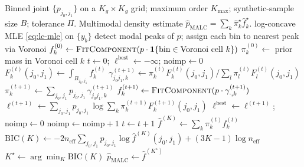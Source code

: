 \documentclass[11pt]{article}
\theoremstyle{plain}
\theoremstyle{definition}
\theoremstyle{remark}
\begin{document}
\begin{algorithm}[t]
\caption{Mixture MALC from binned probabilities $\{p_{j_0, j_1}\}$.}
\label{alg:malc-mixture}
\begin{algorithmic}[1]
\Require Binned joint $\{p_{j_0, j_1}\}$ on a $K_g \times K_g$ grid;
maximum order $K_{\max}$; synthetic-sample size $B$; tolerance $\Pi$.
\Ensure Multimodal density estimate
$\hat{p}_{\mathrm{MALC}} = \sum_{k} \hat\pi_k^\star \hat f_k^\star$.
    \State \Return log-concave MLE \eqref{eq:lc-mle} on $\{y_b\}$
\EndFunction
{}
    \State detect modal peaks of $p$; assign each bin to nearest peak via Voronoi 
        \State $f_k^{(0)} \gets \Call{FitComponent}{p \cdot \mathbf{1}\{\text{bin} \in \text{Voronoi cell } k\}}$
        \State $\pi_k^{(0)} \gets $ prior mass in Voronoi cell $k$
    \EndFor
    \State $t \gets 0$; $\ell^{\text{best}} \gets -\infty$; $\text{noimp} \gets 0$
        \State $F_k^{(t)}(j_0, j_1) \gets \int_{B_{j_0, j_1}} f_k^{(t)}$
        \State $\gamma_{j_0 j_1, k}^{(t+1)} \gets
            \pi_k^{(t)} F_k^{(t)}(j_0, j_1) / \sum_l \pi_l^{(t)} F_l^{(t)}(j_0, j_1)$
        \State $\pi_k^{(t+1)} \gets \sum_{j_0, j_1} p_{j_0, j_1}\, \gamma_{j_0 j_1, k}^{(t+1)}$
        \State $f_k^{(t+1)} \gets \Call{FitComponent}{p \cdot \gamma_{\cdot, k}^{(t+1)}}$
        \State $\ell^{(t+1)} \gets \sum_{j_0, j_1} p_{j_0, j_1}\,
                \log \sum_k \pi_k^{(t+1)} F_k^{(t+1)}(j_0, j_1)$
            \State $\ell^{\text{best}} \gets \ell^{(t+1)}$; $\text{noimp} \gets 0$
        \Else
            \State $\text{noimp} \gets \text{noimp} + 1$
        \EndIf
        \State $t \gets t + 1$
    \EndWhile
    \State $\hat f^{(K)} \gets \sum_k \pi_k^{(t)} f_k^{(t)}$
    \State $\mathrm{BIC}(K) \gets
        -2 n_{\mathrm{eff}} \sum_{j_0, j_1} p_{j_0, j_1} \log \hat f^{(K)}(j_0, j_1)
        + (3K - 1)\log n_{\mathrm{eff}}$
\EndFor
\State $K^\star \gets \arg\!\min_K \mathrm{BIC}(K)$
\State \Return $\hat p_{\mathrm{MALC}} \gets \hat f^{(K^\star)}$
\end{algorithmic}
\end{algorithm}
\end{document}
